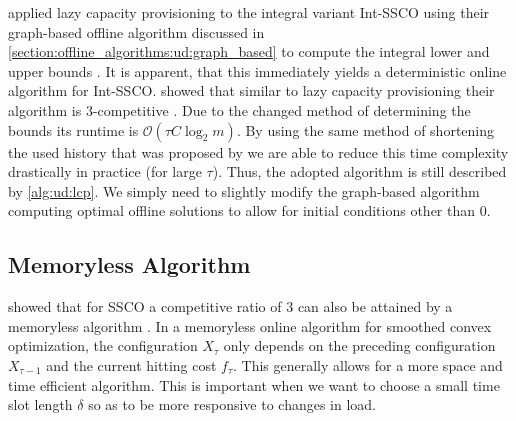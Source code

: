 \citeauthor*{Albers2018} applied lazy capacity provisioning to the integral variant Int-SSCO using their graph-based offline algorithm discussed in \autoref{section:offline_algorithms:ud:graph_based} to compute the integral lower and upper bounds \cite{Albers2018}. It is apparent, that this immediately yields a deterministic online algorithm for Int-SSCO. \citeauthor*{Albers2018} showed that similar to lazy capacity provisioning their algorithm is $3$-competitive \cite{Albers2018}. Due to the changed method of determining the bounds its runtime is $\mathcal{O}(\tau C \log_2 m)$. By using the same method of shortening the used history that was proposed by \citeauthor*{Lin2011} we are able to reduce this time complexity drastically in practice (for large $\tau$). Thus, the adopted algorithm is still described by \autoref{alg:ud:lcp}. We simply need to slightly modify the graph-based algorithm computing optimal offline solutions to allow for initial conditions other than $0$.

\subsection{Memoryless Algorithm}\label{section:online_algorithms:ud:memoryless}

\citeauthor*{Bansal2015} showed that for SSCO a competitive ratio of $3$ can also be attained by a memoryless algorithm \cite{Bansal2015}. In a memoryless online algorithm for smoothed convex optimization, the configuration $X_{\tau}$ only depends on the preceding configuration $X_{\tau-1}$ and the current hitting cost $f_{\tau}$. This generally allows for a more space and time efficient algorithm. This is important when we want to choose a small time slot length $\delta$ so as to be more responsive to changes in load.


